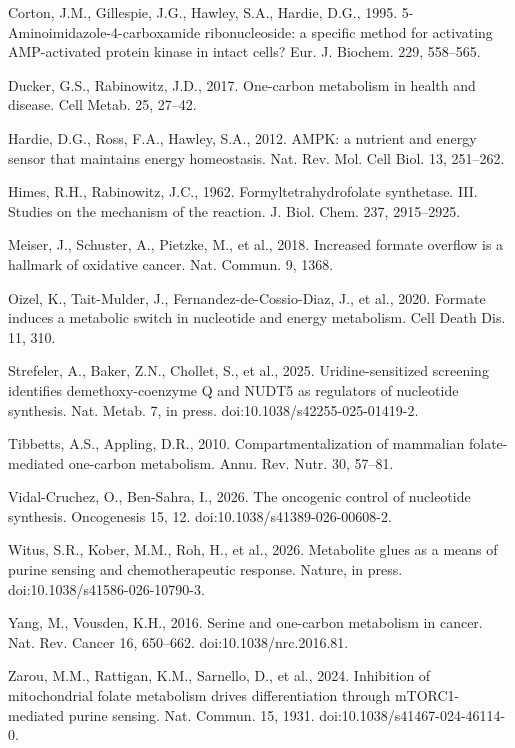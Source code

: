 \documentclass[a4paper,fleqn]{cas-sc}
\begin{document}

\begin{thebibliography}{}

Corton, J.M., Gillespie, J.G., Hawley, S.A., Hardie, D.G., 1995.
5-Aminoimidazole-4-carboxamide ribonucleoside: a specific method for activating
AMP-activated protein kinase in intact cells? Eur. J. Biochem. 229, 558--565.

Ducker, G.S., Rabinowitz, J.D., 2017. One-carbon metabolism in health and
disease. Cell Metab. 25, 27--42.

Hardie, D.G., Ross, F.A., Hawley, S.A., 2012. AMPK: a nutrient and energy sensor
that maintains energy homeostasis. Nat. Rev. Mol. Cell Biol. 13, 251--262.

Himes, R.H., Rabinowitz, J.C., 1962. Formyltetrahydrofolate synthetase. III.
Studies on the mechanism of the reaction. J. Biol. Chem. 237, 2915--2925.

Meiser, J., Schuster, A., Pietzke, M., et al., 2018. Increased formate overflow
is a hallmark of oxidative cancer. Nat. Commun. 9, 1368.

Oizel, K., Tait-Mulder, J., Fernandez-de-Cossio-Diaz, J., et al., 2020. Formate
induces a metabolic switch in nucleotide and energy metabolism. Cell Death Dis.
11, 310.

Strefeler, A., Baker, Z.N., Chollet, S., et al., 2025. Uridine-sensitized
screening identifies demethoxy-coenzyme Q and NUDT5 as regulators of nucleotide
synthesis. Nat. Metab. 7, in press. doi:10.1038/s42255-025-01419-2.

Tibbetts, A.S., Appling, D.R., 2010. Compartmentalization of mammalian
folate-mediated one-carbon metabolism. Annu. Rev. Nutr. 30, 57--81.

Vidal-Cruchez, O., Ben-Sahra, I., 2026. The oncogenic control of nucleotide
synthesis. Oncogenesis 15, 12. doi:10.1038/s41389-026-00608-2.

Witus, S.R., Kober, M.M., Roh, H., et al., 2026. Metabolite glues as a means of
purine sensing and chemotherapeutic response. Nature, in press.
doi:10.1038/s41586-026-10790-3.

Yang, M., Vousden, K.H., 2016. Serine and one-carbon metabolism in cancer. Nat.
Rev. Cancer 16, 650--662. doi:10.1038/nrc.2016.81.

Zarou, M.M., Rattigan, K.M., Sarnello, D., et al., 2024. Inhibition of
mitochondrial folate metabolism drives differentiation through mTORC1-mediated
purine sensing. Nat. Commun. 15, 1931. doi:10.1038/s41467-024-46114-0.

\end{thebibliography}
\end{document}
